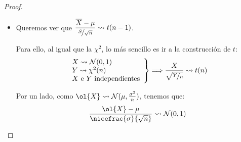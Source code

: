 \begin{coro}
\begin{proof}
\begin{itemize}
            Veamos la función generatriz de momentos de $A$ y $C$:
            \begin{itemize}
                \item Para $A$, tenemos que $A\rightsquigarrow \chi^2(n)$, por lo que:
                \begin{equation*}
                    M_A(t) = \dfrac{1}{{(1-2t)}^{\nicefrac{n}{2}}} \qquad t < \frac{1}{2}
                \end{equation*}
                \item Para $C$, tenemos que $C\rightsquigarrow \chi^2(1)$, por lo que:
                \begin{equation*}
                    M_C(t) = \dfrac{1}{{(1-2t)}^{\frac{1}{2}}} \qquad t < \frac{1}{2}
                \end{equation*}
            \end{itemize}

            Por tanto, tenemos que:
            \begin{equation*}
                M_B(t) = \dfrac{M_A(t)}{M_C(t)} = \dfrac{\dfrac{1}{{(1-2t)}^{\frac{n}{2}}}}{\dfrac{1}{{(1-2t)}^{\frac{1}{2}}}} = \dfrac{1}{{(1-2t)}^{\frac{n-1}{2}}} \qquad  t<\frac{1}{2}
            \end{equation*}
            De aquí, deducimos que $B\rightsquigarrow \chi^2(n-1)$.
        \item Queremos ver que $\dfrac{\overline{X}-\mu}{\nicefrac{S}{\sqrt{n}}}\rightsquigarrow t(n-1)$.

            Para ello, al igual que la $\chi^2$, lo más sencillo es ir a la construcción de $t$:
            \begin{equation*}
                \left.\begin{array}{l}
                        X\rightsquigarrow \mathcal{N}(0,1) \\
                        Y \rightsquigarrow\chi^2(n) \\
                        \text{$X$ e $Y$ independientes}
                \end{array}\right\}\Longrightarrow \dfrac{X}{\sqrt{\nicefrac{Y}{n}}} \rightsquigarrow t(n)
            \end{equation*}
            
            Por un lado, como $\ol{X}\rightsquigarrow \cc{N}(\mu, \frac{\sigma^2}{n})$, tenemos que:
            \begin{equation*}
                \dfrac{\ol{X}-\mu}{\nicefrac{\sigma}{\sqrt{n}}} \rightsquigarrow \cc{N}(0,1)
            \end{equation*}


\end{itemize}
\end{proof}
\end{coro}
